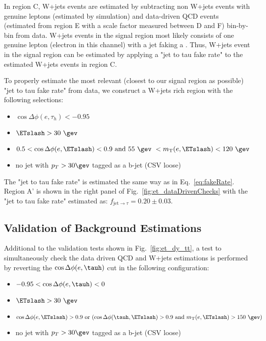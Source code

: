 In region C, W+jets events are estimated by subtracting non W+jets events
with genuine leptons (estimated by simulation) and data-driven QCD events 
(estimated from region E with a scale factor measured between D and F) 
bin-by-bin from data. W+jets events in the signal region most likely 
consists of one genuine lepton (electron in this channel) with a jet 
faking a \tauh. Thus, W+jets event in the signal region can be estimated 
by applying a "jet to tau fake rate" to the estimated W+jets events in region C.

To properly estimate the most relevant (closest to our signal region as possible) 
"jet to tau fake rate" from data, we construct a W+jets rich region with the 
following selections:
\begin{itemize}
  \item $\cos{\Delta \phi (e,\tau_{h})}<-0.95$
  \item $\ETslash>30~\gev$
  \item $0.5 < \cos{\Delta \phi (e,\ETslash)} < 0.9~\text{and}~55~\gev~< m_{\text{T}}(e,\ETslash) < 120~\gev$
  \item no jet with $p_T>30\gev$ tagged as a b-jet (CSV loose)
\end{itemize}
The "jet to tau fake rate" is estimated the same way as in Eq.~\ref{eq:fakeRate}.
Region A' is shown in the right panel of Fig.~\ref{fig:et_dataDrivenChecks} 
with the "jet to tau fake rate" estimated as: $f_{\text{jet}\rightarrow\tau} = 0.20 \pm 0.03$.

\subsection{Validation of Background Estimations}
Additional to the validation tests shown in Fig.~\ref{fig:et_dy_tt}, a test 
to simultaneously check the data driven QCD and W+jets estimations is performed 
by reverting the $\cos{\Delta \phi (e,\tauh)}$ cut in the following configuration:
\begin{itemize}
  \item $ -0.95 < \cos{\Delta \phi (e,\tauh)} < 0$
  \item $\ETslash>30~\gev$
  \item $\cos{\Delta \phi (e,\ETslash)} > 0.9~\text{or}~(\cos{\Delta \phi (\tauh,\ETslash)} > 0.9~\text{and}~m_{\text{T}}(e,\ETslash) > 150~\gev)$
  \item no jet with $p_T>30\gev$ tagged as a b-jet (CSV loose)
\end{itemize}

